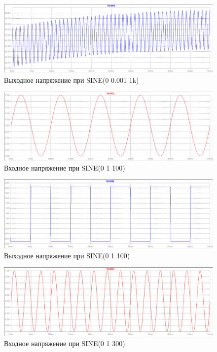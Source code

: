 \documentclass[a4paper, 12pt]{article}
\begin{document}
    \begin{figure}[H]
        \centering
        \includegraphics[scale=0.46]{3task_sine_out_1mV_1kf.png}
        \captionsetup{skip=0pt}
        \caption{Выходное напряжение при SINE(0 0.001 1k)}
        \label{fig:3task_sine_out_1mV_1kf}
    \end{figure}
    \begin{figure}[H]
        \centering
        \includegraphics[scale=0.46]{3task_sine_in_1V_100f.png}
        \captionsetup{skip=0pt}
        \caption{Входное напряжение при SINE(0 1 100)}
        \label{fig:3task_sine_in_1V_100f}
    \end{figure}
    \begin{figure}[H]
        \centering
        \includegraphics[scale=0.46]{3task_sine_out_1V_100f.png}
        \captionsetup{skip=0pt}
        \caption{Выходное напряжение при SINE(0 1 100)}
        \label{fig:3task_sine_out_1V_100f}
    \end{figure}
    \begin{figure}[H]
        \centering
        \includegraphics[scale=0.46]{3task_sine_in_1V_300f.png}
        \captionsetup{skip=0pt}
        \caption{Входное напряжение при SINE(0 1 300)}
        \label{fig:3task_sine_in_1V_300f}
    \end{figure}
\end{document}
